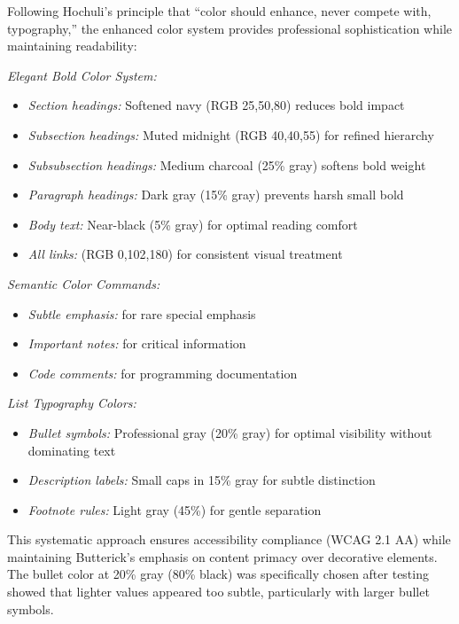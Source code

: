 \documentclass[11pt]{article}
\begin{document}
Following Hochuli's principle that \enquote{color should enhance, never compete with, typography,} the enhanced color system provides professional sophistication while maintaining readability:

\emph{Elegant Bold Color System:}
\begin{itemize}
\item \emph{Section headings:} \textcolor{sectioncolor}{Softened navy} (RGB 25,50,80) reduces bold impact
\item \emph{Subsection headings:} \textcolor{subsectioncolor}{Muted midnight} (RGB 40,40,55) for refined hierarchy
\item \emph{Subsubsection headings:} \textcolor{subsubcolor}{Medium charcoal} (25\% gray) softens bold weight
\item \emph{Paragraph headings:} \textcolor{paragraphcolor}{Dark gray} (15\% gray) prevents harsh small bold
\item \emph{Body text:} \textcolor{textblack}{Near-black (5\% gray)} for optimal reading comfort
\item \emph{All links:}  (RGB 0,102,180) for consistent visual treatment
\end{itemize}

\emph{Semantic Color Commands:}
\begin{itemize}
\item \emph{Subtle emphasis:}  for rare special emphasis
\item \emph{Important notes:}  for critical information
\item \emph{Code comments:}  for programming documentation
\end{itemize}

\emph{List Typography Colors:}
\begin{itemize}
\item \emph{Bullet symbols:} Professional gray (20\% gray) for optimal visibility without dominating text
\item \emph{Description labels:} Small caps in 15\% gray for subtle distinction
\item \emph{Footnote rules:} Light gray (45\%) for gentle separation
\end{itemize}

This systematic approach ensures accessibility compliance (WCAG 2.1 AA) while maintaining Butterick's emphasis on content primacy over decorative elements. The bullet color at 20\% gray (80\% black) was specifically chosen after testing showed that lighter values appeared too subtle, particularly with larger bullet symbols.
\end{document}
